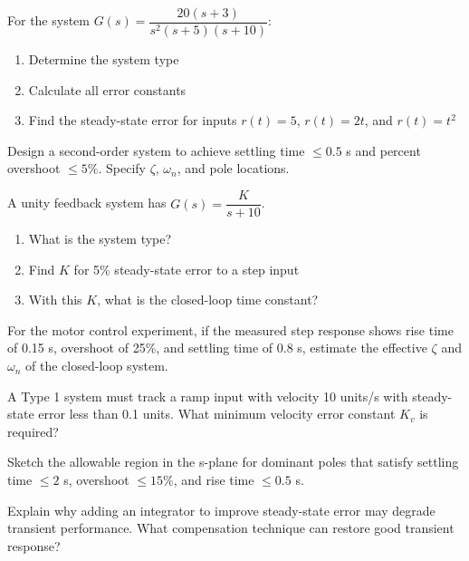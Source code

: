 \begin{exercise}
For the system $G(s) = \dfrac{20(s+3)}{s^2(s+5)(s+10)}$:
\begin{enumerate}
    \item Determine the system type
    \item Calculate all error constants
    \item Find the steady-state error for inputs $r(t) = 5$, $r(t) = 2t$, and $r(t) = t^2$
\end{enumerate}
\end{exercise}

\begin{exercise}
Design a second-order system to achieve settling time $\leq 0.5$ s and percent overshoot $\leq 5\%$. Specify $\zeta$, $\omega_n$, and pole locations.
\end{exercise}

\begin{exercise}
A unity feedback system has $G(s) = \dfrac{K}{s+10}$.
\begin{enumerate}
    \item What is the system type?
    \item Find $K$ for 5\% steady-state error to a step input
    \item With this $K$, what is the closed-loop time constant?
\end{enumerate}
\end{exercise}

\begin{exercise}
For the motor control experiment, if the measured step response shows rise time of 0.15 s, overshoot of 25\%, and settling time of 0.8 s, estimate the effective $\zeta$ and $\omega_n$ of the closed-loop system.
\end{exercise}

\begin{exercise}
A Type 1 system must track a ramp input with velocity 10 units/s with steady-state error less than 0.1 units. What minimum velocity error constant $K_v$ is required?
\end{exercise}

\begin{exercise}
Sketch the allowable region in the s-plane for dominant poles that satisfy settling time $\leq 2$ s, overshoot $\leq 15\%$, and rise time $\leq 0.5$ s.
\end{exercise}

\begin{exercise}
Explain why adding an integrator to improve steady-state error may degrade transient performance. What compensation technique can restore good transient response?
\end{exercise}

